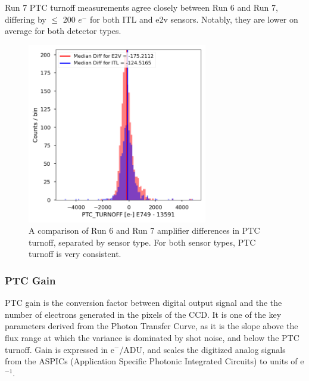Run 7 PTC turnoff measurements agree closely between Run 6 and Run 7, differing by $\leq$ 200 $e^-$ for both ITL and e2v sensors. Notably, they are lower on average for both detector types.

\begin{figure}[H]
\begin{centering}
\includegraphics[width=0.7\textwidth]{figures/baselineCharacterization/PTC_TURNOFF_13591_E749_diff.png}
\caption{A comparison of Run 6 and Run 7 amplifier differences in PTC turnoff, separated by sensor type. For both sensor types, PTC turnoff is very consistent.}
\end{centering}
\end{figure}

\subsubsection{PTC Gain}\label{ptc-gain}

PTC gain is the conversion factor between digital output signal and the the number of electrons generated in the pixels of the CCD. It is one of the key parameters derived from the Photon Transfer
Curve, as it is the slope above the flux range at which the variance is dominated by shot noise, and below the PTC turnoff. Gain is expressed in e$^-$/ADU, and scales the digitized analog signals from the ASPICs (Application Specific Photonic Integrated Circuits) to units of e$^{-1}$.


